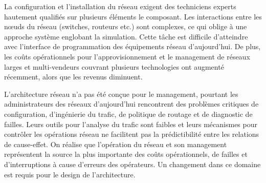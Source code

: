 La configuration et l'installation du réseau exigent des techniciens experts hautement qualifiés sur plusieurs éléments le composant. Les interactions entre les nœuds du réseau (switches, routeurs etc.) sont complexes, ce qui oblige à une approche système englobant la simulation. Cette tâche est difficile d'atteindre avec l'interface de programmation des équipements réseau d'aujourd'hui. De plus, les coûts opérationnels pour l'approvisionnement et le management de réseaux larges et multi-vendeurs  couvrant plusieurs technologies ont augmenté récemment, alors que les revenus diminuent. \cite{ImplementationChallengesForSDN}







L'architecture réseau n'a pas été conçue pour le management, pourtant les administrateurs des réseaux d'aujourd'hui rencontrent des problèmes critiques de configuration, d'ingénierie du trafic, de politique de routage et de diagnostic de failles. Leurs outils pour l'analyse du trafic sont faibles et leurs mécanismes pour contrôler les opérations réseau ne facilitent pas la prédictibilité entre les relations de cause-effet. On réalise que l'opération du réseau et son management représentent la source la plus importante des coûts opérationnels, de failles et d'interruptions à cause d'erreurs des opérateurs. Un changement dans ce domaine est requis pour le design de l'architecture. \cite{NGSIManagement}


\clearpage




